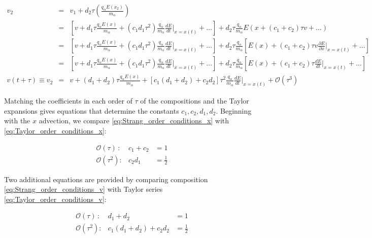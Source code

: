 \documentclass[11pt,titlepage]{report}
\begin{document}
\begin{eqnarray}
v_2 & = & v_1 + d_2\tau \left(\frac{q_{\alpha}E(x_2)}{m_{\alpha}}\right) \nonumber \\[0.3em]
& = & \left[ v + d_1\tau \frac{q_{\alpha}E(x)}{m_{\alpha}} + (c_1d_1\tau^2 )\frac{q_{\alpha}}{m_{\alpha}}\frac{dE}{dt}\biggr|_{x = x(t)} + \ldots \right] + d_2\tau \frac{q_{\alpha}}{m_{\alpha}} E\left(x +  (c_1 + c_2)\tau v + \ldots \right)\nonumber \\[0.3em]
& = & \left[ v + d_1\tau \frac{q_{\alpha}E(x)}{m_{\alpha}} + (c_1d_1\tau^2 )\frac{q_{\alpha}}{m_{\alpha}}\frac{dE}{dt}\biggr|_{x = x(t)} + \ldots \right] + d_2\tau \frac{q_{\alpha}}{m_{\alpha}}\left[E(x) + (c_1 + c_2)\tau v\frac{\partial E}{\partial x}\biggr|_{x = x(t)} + \ldots\right] \nonumber \\[0.3em]
& = & \left[ v + d_1\tau \frac{q_{\alpha}E(x)}{m_{\alpha}} + (c_1d_1\tau^2 )\frac{q_{\alpha}}{m_{\alpha}}\frac{dE}{dt}\biggr|_{x = x(t)} + \ldots \right] + d_2\tau \frac{q_{\alpha}}{m_{\alpha}}\left[E(x) + (c_1 + c_2)\tau \frac{dE}{dt}\biggr|_{x = x(t)} + \ldots \right] \nonumber \\[0.5em]
v(t + \tau ) \equiv v_2 & = & v + (d_1 + d_2)\tau\frac{q_{\alpha}E(x)}{m_{\alpha}} + [c_1(d_1 + d_2) + c_2d_2]\tau^2 \frac{q_{\alpha}}{m_{\alpha}}\frac{dE}{dt}\biggr|_{x = x(t)} + \mathcal{O}(\tau^3) \label{eq:Strang_order_conditions_v}
\end{eqnarray}

\noindent Matching the coefficients in each order of $\tau$ of the compositions and the Taylor expansions gives equations that determine the constants $c_1, c_2, d_1, d_2$. Beginning with the $x$ advection, we compare \eqref{eq:Strang_order_conditions_x} with \eqref{eq:Taylor_order_conditions_x}:

\begin{eqnarray*}
\mathcal{O}(\tau )\, :  & c_1 + c_2 & = 1 \\[0.3em]
\mathcal{O}(\tau^2 ) : & c_2 d_1 & = \frac{1}{2}
\end{eqnarray*}

\noindent Two additional equations are provided by comparing composition \eqref{eq:Strang_order_conditions_v} with Taylor series \eqref{eq:Taylor_order_conditions_v}:

\begin{eqnarray*}
\mathcal{O}(\tau ) \, :  & d_1 + d_2 & = 1 \\[0.3em]
\mathcal{O}(\tau^2 ) : & c_1(d_1 + d_2) + c_2d_2 & = \frac{1}{2}
\end{eqnarray*}
\end{document}
